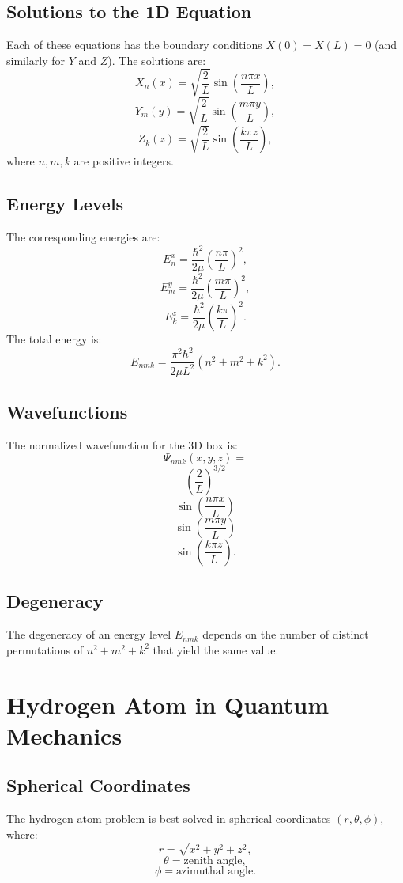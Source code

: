 \documentclass[a4paper,12pt]{article}
\begin{document}
\begin{multicols}{2}
\subsection*{Solutions to the 1D Equation}
Each of these equations has the boundary conditions \( X(0) = X(L) = 0 \) (and similarly for \( Y \) and \( Z \)). The solutions are:
\[
X_n(x) = \sqrt{\frac{2}{L}} \sin\left(\frac{n\pi x}{L}\right), 
\]
\[
Y_m(y) = \sqrt{\frac{2}{L}} \sin\left(\frac{m\pi y}{L}\right), 
\]
\[
Z_k(z) = \sqrt{\frac{2}{L}} \sin\left(\frac{k\pi z}{L}\right),
\]
where \( n, m, k \) are positive integers.

\subsection*{Energy Levels}
The corresponding energies are:
\[
E^x_n = \frac{\hbar^2}{2\mu} \left(\frac{n\pi}{L}\right)^2, 
\]
\[
E^y_m = \frac{\hbar^2}{2\mu} \left(\frac{m\pi}{L}\right)^2, 
\]
\[
E^z_k = \frac{\hbar^2}{2\mu} \left(\frac{k\pi}{L}\right)^2.
\]
The total energy is:
\[
E_{nmk} = \frac{\pi^2 \hbar^2}{2\mu L^2} (n^2 + m^2 + k^2).
\]

\subsection*{Wavefunctions}
The normalized wavefunction for the 3D box is:
\[
\Psi_{nmk}(x,y,z) = 
\]
\[
\left(\frac{2}{L}\right)^{3/2} 
\]
\[
\sin\left(\frac{n\pi x}{L}\right) 
\]
\[
\sin\left(\frac{m\pi y}{L}\right) 
\]
\[
\sin\left(\frac{k\pi z}{L}\right).
\]

\subsection*{Degeneracy}
The degeneracy of an energy level \( E_{nmk} \) depends on the number of distinct permutations of \( n^2 + m^2 + k^2 \) that yield the same value.

\section*{Hydrogen Atom in Quantum Mechanics}
\subsection*{Spherical Coordinates}
The hydrogen atom problem is best solved in spherical coordinates \( (r, \theta, \phi) \), where:
\[
r = \sqrt{x^2 + y^2 + z^2},
\]
\[
\theta = \text{zenith angle},
\]
\[
\phi = \text{azimuthal angle}.
\]


\end{multicols}
\end{document}
